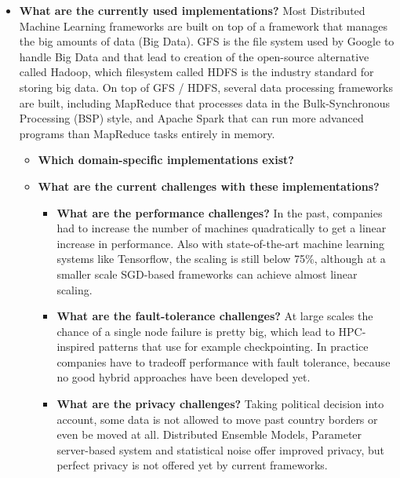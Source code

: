 \begin{itemize}
	\item \textbf{What are the currently used implementations?} Most Distributed Machine Learning frameworks are built on top of a framework that manages the big amounts of data (Big Data). GFS is the file system used by Google to handle Big Data and that lead to creation of the open-source alternative called Hadoop, which filesystem called HDFS is the industry standard for storing big data. On top of GFS / HDFS, several data processing frameworks are built, including MapReduce that processes data in the Bulk-Synchronous Processing (BSP) style, and Apache Spark that can run more advanced programs than MapReduce tasks entirely in memory.
	\begin{itemize}
		\item \textbf{Which domain-specific implementations exist?}
		\item \textbf{What are the current challenges with these implementations?}
		\begin{itemize}
			\item \textbf{What are the performance challenges?} In the past, companies had to increase the number of machines quadratically to get a linear increase in performance. Also with state-of-the-art machine learning systems like Tensorflow, the scaling is still below 75\%, although at a smaller scale SGD-based frameworks can achieve almost linear scaling.
			\item \textbf{What are the fault-tolerance challenges?} At large scales the chance of a single node failure is pretty big, which lead to HPC-inspired patterns that use for example checkpointing. In practice companies have to tradeoff performance with fault tolerance, because no good hybrid approaches have been developed yet.
			\item \textbf{What are the privacy challenges?} Taking political decision into account, some data is not allowed to move past country borders or even be moved at all. Distributed Ensemble Models, Parameter server-based system and statistical noise offer improved privacy, but perfect privacy is not offered yet by current frameworks.
		\end{itemize}
	\end{itemize}
\end{itemize}

